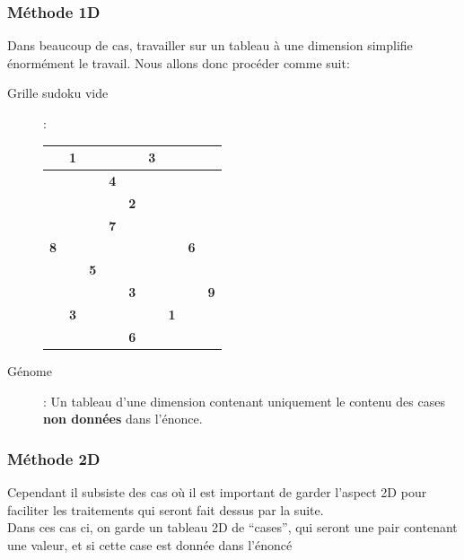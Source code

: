             \subsubsection{Méthode 1D}
                Dans beaucoup de cas, travailler sur un tableau à une dimension simplifie énormément le travail. Nous allons donc procéder comme suit:
                \begin{description}
                    \item[Grille sudoku vide]:\\
                        \begin{center}
                            \begin{tabular}{|c|c|c| |c|c|c| |c|c|c|}
                                \hline
                                &\textbf{1}&&&&\textbf{3}&&&\\
                                \hline
                                &&&\textbf{4}&&&&&\\
                                \hline
                                &&&&\textbf{2}&&&&\\
                                \hline
                                \hline
                                &&&\textbf{7}&&&&&\\
                                \hline
                                \textbf{8}&&&&&&&\textbf{6}&\\
                                \hline
                                &&\textbf{5}&&&&&&\\
                                \hline
                                \hline
                                &&&&\textbf{3}&&&&\textbf{9}\\
                                \hline
                                &\textbf{3}&&&&&\textbf{1}&&\\
                                \hline
                                &&&&\textbf{6}&&&&\\
                                \hline
                            \end    {tabular}
                        \end{center}
                    \item[G\'enome]: Un tableau d'une dimension contenant uniquement le contenu des cases \textbf{non données} dans l'énonce.
                \end{description}
            \subsubsection{Méthode 2D}
                Cependant il subsiste des cas où il est important de garder l'aspect 2D pour faciliter les traitements qui seront fait dessus par la suite.\\
                Dans ces cas ci, on garde un tableau 2D de ``cases'', qui seront une pair contenant une valeur, et si cette case est donnée dans l'énoncé
